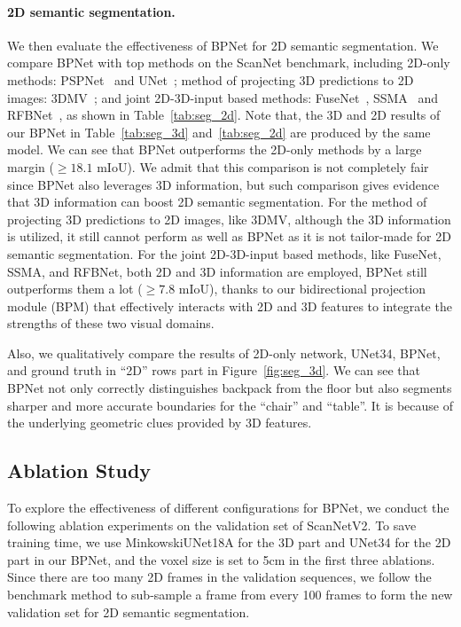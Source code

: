 \documentclass[final]{cvpr}
\begin{document}
\vspace{-4mm}
\paragraph{2D semantic segmentation.}
We then evaluate the effectiveness of BPNet for 2D semantic segmentation.
We compare BPNet with top methods on the ScanNet benchmark, including 2D-only methods: PSPNet~\cite{zhao2017pyramid} and UNet~\cite{ronneberger2015u}; method of projecting 3D predictions to 2D images: 3DMV~\cite{dai20183dmv}; and joint 2D-3D-input based methods: FuseNet~\cite{hazirbas2016fusenet}, SSMA~\cite{valada2019self} and RFBNet~\cite{deng2019rfbnet}, as shown in Table~\ref{tab:seg_2d}.
Note that, the 3D and 2D results of our BPNet in Table~\ref{tab:seg_3d} and~\ref{tab:seg_2d} are produced by the same model.
We can see that BPNet outperforms the 2D-only methods by a large margin ($\geq 18.1$ mIoU).
We admit that this comparison is not completely fair since BPNet also leverages 3D information, but such comparison gives evidence that 3D information can boost 2D semantic segmentation.
For the method of projecting 3D predictions to 2D images, like 3DMV, although the 3D information is utilized, it still cannot perform as well as BPNet as it is not tailor-made for 2D semantic segmentation.
For the joint 2D-3D-input based methods, like FuseNet, SSMA, and RFBNet, both 2D and 3D information are employed, BPNet still outperforms them a lot ($\geq 7.8$ mIoU), thanks to our bidirectional projection module (BPM) that effectively interacts with 2D and 3D features to integrate the strengths of these two visual domains.

Also, we qualitatively compare the results of 2D-only network, UNet34, BPNet, and ground truth in ``2D'' rows part in Figure~\ref{fig:seg_3d}.
We can see that BPNet not only correctly distinguishes backpack from the floor but also segments sharper and more accurate boundaries for the ``chair'' and ``table''.
It is because of the underlying geometric clues provided by 3D features.



\subsection{Ablation Study}
To explore the effectiveness of different configurations for BPNet, we conduct the following ablation experiments on the validation set of ScanNetV2.
To save training time, we use MinkowskiUNet18A for the 3D part and UNet34 for the 2D part in our BPNet, and the voxel size is set to 5cm in the first three ablations.
Since there are too many 2D frames in the validation sequences, we follow the benchmark method to sub-sample a frame from every 100 frames to form the new validation set for 2D semantic segmentation.
\end{document}
